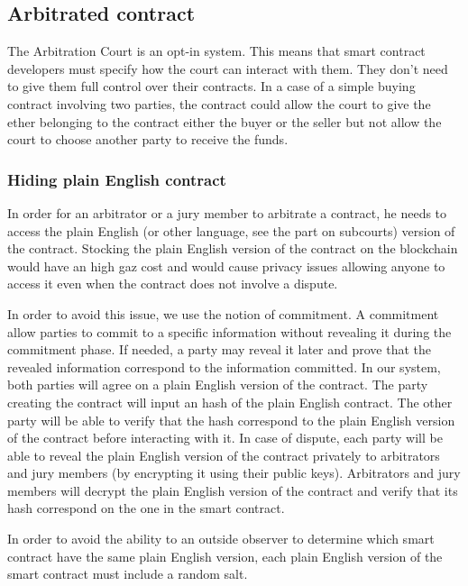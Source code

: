 \documentclass[12 pt]{article}
\begin{document}
\subsection{Arbitrated contract}
The Arbitration Court is an opt-in system. This means that smart contract developers must specify how the court can interact with them. They don't need to give them full control over their contracts.
In a case of a simple buying contract involving two parties, the contract could allow the court to give the ether belonging to the contract either the buyer or the seller but not allow the court to choose another party to receive the funds.

\subsubsection{Hiding plain English contract}
\label{plainenglish}
In order for an arbitrator or a jury member to arbitrate a contract, he needs to access the plain English (or other language, see the part on subcourts) version of the contract.
Stocking the plain English version of the contract on the blockchain would have an high gaz cost and would cause privacy issues allowing anyone to access it even when the contract does not involve a dispute.

In order to avoid this issue, we use the notion of commitment.
A commitment allow parties to commit to a specific information without revealing it during the commitment phase. If needed, a party may reveal it later and prove that the revealed information correspond to the information committed.
In our system, both parties will agree on a plain English version of the contract. The party creating the contract will input an hash of the plain English contract. The other party will be able to verify that the hash correspond to the plain English version of the contract before interacting with it.
In case of dispute, each party will be able to reveal the plain English version of the contract privately to arbitrators and jury members (by encrypting it using their public keys).
Arbitrators and jury members will decrypt the plain English version of the contract and verify that its hash correspond on the one in the smart contract.

In order to avoid the ability to an outside observer to determine which smart contract have the same plain English version, each plain English version of the smart contract must include a random salt.
\end{document}

